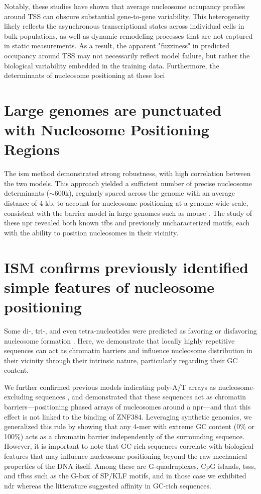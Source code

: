 \documentclass[11pt]{book}
\begin{document}
Notably, these studies have shown that average nucleosome occupancy profiles around TSS can obscure substantial gene-to-gene variability. This heterogeneity likely reflects the asynchronous transcriptional states across individual cells in bulk populations, as well as dynamic remodeling processes that are not captured in static measurements. As a result, the apparent "fuzziness" in predicted occupancy around TSS may not necessarily reflect model failure, but rather the biological variability embedded in the training data. Furthermore, the determinants of nucleosome positioning at these loci

\section{Large genomes are punctuated with Nucleosome Positioning Regions}
The \gls{ism} method demonstrated strong robustness, with high correlation between the two models. This approach yielded a sufficient number of precise nucleosome determinants ($\sim$600k), regularly spaced across the genome with an average distance of 4 kb, to account for nucleosome positioning at a genome-wide scale, consistent with the barrier model in large genomes such as mouse \cite{mavrich_barrier_2008}. The study of these \gls{npr} revealed both known \gls{tfbs} and previously uncharacterized motifs, each with the ability to position nucleosomes in their vicinity.

\section{ISM confirms previously identified simple features of nucleosome positioning}
Some di-, tri-, and even tetra-nucleotides were predicted as favoring or disfavoring nucleosome formation \cite{xianfu_nucleosome_2011, giancarlo_epigenomic_2015, masoudi-sobhanzadeh_interpretable_2024}. Here, we demonstrate that locally highly repetitive sequences can act as chromatin barriers and influence nucleosome distribution in their vicinity through their intrinsic nature, particularly regarding their GC content.

We further confirmed previous models indicating poly-A/T arrays as nucleosome-excluding sequences \cite{giancarlo_epigenomic_2015, masoudi-sobhanzadeh_interpretable_2024}, and demonstrated that these sequences act as chromatin barriers—positioning phased arrays of nucleosomes around a \gls{npr}—and that this effect is not linked to the binding of ZNF384. Leveraging synthetic genomics, we generalized this rule by showing that any 4-mer with extreme GC content (0\% or 100\%) acts as a chromatin barrier independently of the surrounding sequence. However, it is important to note that GC-rich sequences correlate with biological features that may influence nucleosome positioning beyond the raw mechanical properties of the DNA itself. Among these are G-quadruplexes, CpG islands, \glspl{tss}, and \glspl{tfbs} such as the G-box of SP/KLF motifs, and in those case we exhibited \gls{ndr} whereas the litterature suggested affinity in GC-rich sequences.
\end{document}
